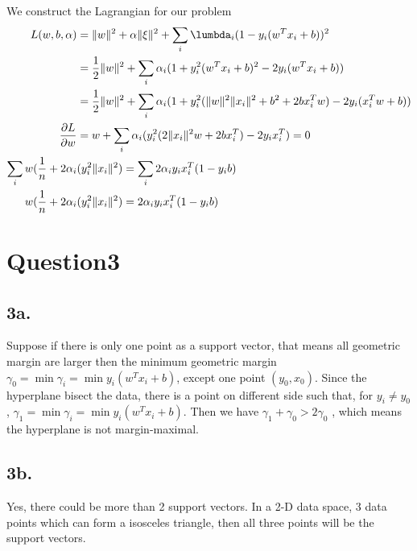 \documentclass{article}
\begin{document}
We construct the Lagrangian for our problem
\begin{equation}
  \begin{split}
    L(w, b, \alpha) &= \Vert w \Vert^2 + \alpha \Vert \xi \Vert^2 + \sum_i \lumbda_i (1 - y_i (w^T x_i + b))^2\\
    &= \frac{1}{2}\Vert w \Vert^2 + \sum_i \alpha_i (1 + y_i^2 (w^T x_i + b)^2 - 2 y_i (w^T x_i + b))\\
    &= \frac{1}{2}\Vert w \Vert^2 + \sum_i \alpha_i (1 + y_i^2 (\Vert w \Vert^2 \Vert x_i \Vert^2 + b^2 + 2 b x_i^T w  ) - 2 y_i ( x_i^T w + b))\\
    \pdv{L}{w} &=  w +  \sum_i \alpha_i ( y_i^2 (2\Vert x_i \Vert^2 w + 2 b x_i^T )- 2 y_i x_i ^ T ) = 0 \\
    \sum_i  w ( \frac{1}{n} + 2 \alpha_i &( y_i^2 \Vert x_i \Vert^2 ) = \sum_i 2 \alpha_i y_i x_i ^ T ( 1 - y_i b  )\\
    w ( \frac{1}{n} + 2 \alpha_i &( y_i^2 \Vert x_i \Vert^2 ) = 2 \alpha_i y_i x_i ^ T ( 1 - y_i b  )\\
  \end{split}
\end{equation}



\section*{Question3}
\subsection*{3a. }
Suppose if there is only one point as a support vector, that means all geometric margin are larger then the minimum geometric margin $ \gamma_0 = \min \gamma_i = \min y_i (w^T x_i + b) $, except one point $(y_0,x_0)$.
Since the hyperplane bisect the data, there is a point on different side such that, for $y_i \neq y_0 $, $ \gamma_1 = \min \gamma_i = \min y_i (w^T x_i + b) $. Then we have $ \gamma_1 +  \gamma_0 > 2  \gamma_0$ , which means the hyperplane is not margin-maximal.

\subsection*{3b. }
Yes, there could be more than 2 support vectors. In a 2-D data space, 3 data points which can form a isosceles triangle, then all three points will be the support vectors.
\end{document}
